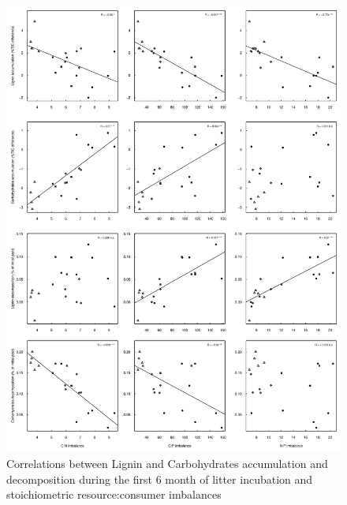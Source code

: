 \documentclass[authoryear,preprint,review,12pt]{elsarticle}
\begin{document}
\newpage
\begin{figure}[h!]
\vspace*{2mm}
\begin{center}
\includegraphics{sbb-graphcorr3}
\end{center}
\caption{Correlations between Lignin and Carbohydrates accumulation and decomposition during the first 6 month of litter incubation and stoichiometric resource:consumer imbalances}
\label{fig:cor3}
\end{figure}
\end{document}
